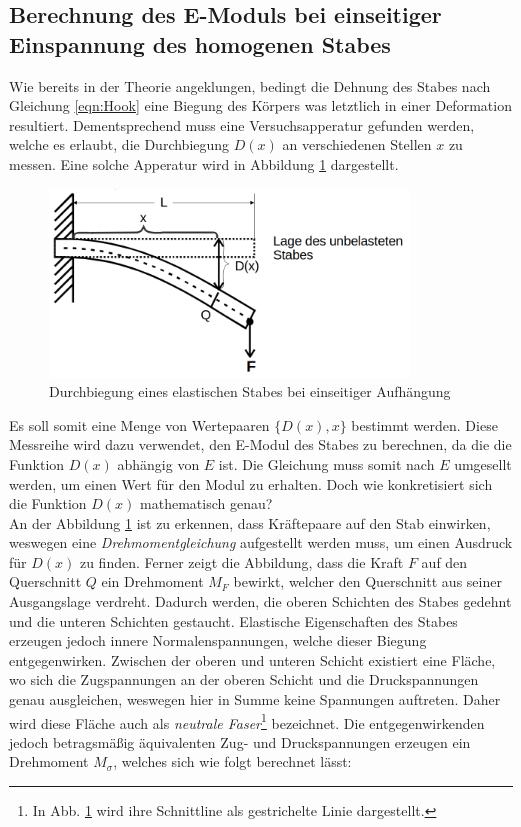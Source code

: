 \subsection{Berechnung des E-Moduls bei einseitiger Einspannung des homogenen Stabes}
\label{sec:Einseitig}

Wie bereits in der Theorie angeklungen, bedingt die Dehnung des Stabes nach Gleichung \eqref{eqn:Hook} eine Biegung des Körpers
was letztlich in einer Deformation resultiert. Dementsprechend muss eine Versuchsapperatur gefunden werden, welche es erlaubt,
die Durchbiegung $D(x)$ an verschiedenen Stellen $x$ zu messen. Eine solche Apperatur wird in Abbildung \ref{fig:Durchbiegung}
dargestellt.

\begin{figure}[H]
    \centering
    \includegraphics[height=5cm]{Durchbiegung.png}
    \caption{Durchbiegung eines elastischen Stabes bei einseitiger Aufhängung}
    \label{fig:Durchbiegung}
\end{figure}

\noindent Es soll somit eine Menge von Wertepaaren $\{D(x),x\}$ bestimmt werden. Diese Messreihe wird dazu verwendet, den E-Modul
des Stabes zu berechnen, da die die Funktion $D(x)$ abhängig von $E$ ist. Die Gleichung muss somit nach $E$ umgesellt werden, um 
einen Wert für den Modul zu erhalten. Doch wie konkretisiert sich die Funktion $D(x)$ mathematisch genau?\\
An der Abbildung \ref{fig:Durchbiegung} ist zu erkennen, dass Kräftepaare auf den Stab einwirken, weswegen eine
\emph{Drehmomentgleichung} aufgestellt werden muss, um einen Ausdruck für $D(x)$ zu finden. Ferner zeigt die Abbildung, dass die Kraft $F$
auf den Querschnitt $Q$ ein Drehmoment $M_F$ bewirkt, welcher den Querschnitt aus seiner Ausgangslage verdreht. Dadurch werden,
die oberen Schichten des Stabes gedehnt und die unteren Schichten gestaucht. Elastische Eigenschaften des Stabes erzeugen jedoch
innere Normalenspannungen, welche dieser Biegung entgegenwirken. Zwischen der oberen und unteren Schicht existiert eine Fläche,
wo sich die Zugspannungen an der oberen Schicht und die Druckspannungen genau ausgleichen, weswegen hier in Summe keine Spannungen 
auftreten. Daher wird diese Fläche auch als \emph{neutrale Faser}\footnote{In Abb. \ref{fig:Durchbiegung} wird ihre Schnittline als gestrichelte Linie dargestellt.} bezeichnet.
Die entgegenwirkenden jedoch betragsmäßig äquivalenten Zug- und Druckspannungen erzeugen ein Drehmoment $M_\sigma$, welches sich wie folgt
berechnet lässt:

